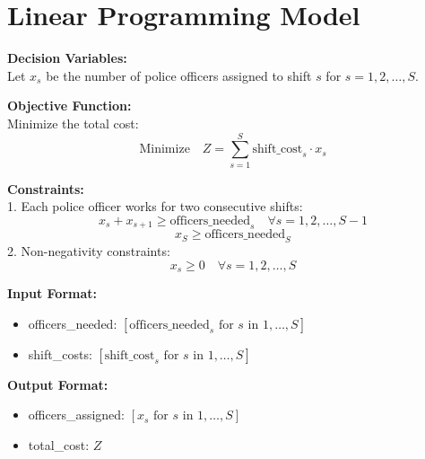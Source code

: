 \documentclass{article}
\begin{document}
\section*{Linear Programming Model}

\textbf{Decision Variables:} \\
Let \( x_s \) be the number of police officers assigned to shift \( s \) for \( s = 1, 2, \ldots, S \).

\textbf{Objective Function:} \\
Minimize the total cost:
\[
\text{Minimize} \quad Z = \sum_{s=1}^{S} \text{shift\_cost}_s \cdot x_s
\]

\textbf{Constraints:} \\
1. Each police officer works for two consecutive shifts:
\[
x_s + x_{s+1} \geq \text{officers\_needed}_s \quad \forall s = 1, 2, \ldots, S-1
\]
\[
x_S \geq \text{officers\_needed}_S
\]
2. Non-negativity constraints:
\[
x_s \geq 0 \quad \forall s = 1, 2, \ldots, S
\]

\textbf{Input Format:}
\begin{itemize}
    \item officers\_needed: \([ \text{officers\_needed}_s \text{ for } s \text{ in } 1, \ldots, S ]\)
    \item shift\_costs: \([ \text{shift\_cost}_s \text{ for } s \text{ in } 1, \ldots, S ]\)
\end{itemize}

\textbf{Output Format:}
\begin{itemize}
    \item officers\_assigned: \([ x_s \text{ for } s \text{ in } 1, \ldots, S ]\)
    \item total\_cost: \( Z \)
\end{itemize}
\end{document}
